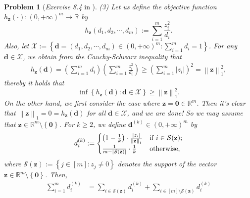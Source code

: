 \documentclass[11pt]{article}
\newtheorem{problem}{Problem}
\numberwithin{equation}{problem}
\begin{document}
\begin{problem} [\emph{Exercise 8.4} in \cite{calafiore2014optimization}]
{\indent (3) Let us define the objective function $h_{\mathbf{z}} (\cdot) : \left( 0, +\infty \right)^m \rightarrow \mathbb{R}$ by
\begin{equation*}
    h_{\mathbf{z}} \left( d_1, d_2, \cdots, d_m \right) :=
    \sum_{i=1}^{m} \frac{z_{i}^2}{d_i}.
\end{equation*}
Also, let $\mathcal{X} := \left\{ \mathbf{d} = \left( d_1, d_2, \cdots, d_m \right) \in \left( 0, +\infty \right)^m : \sum_{i=1}^{m} d_i = 1 \right\}$. For any $\mathbf{d} \in \mathcal{X}$, we obtain from the Cauchy-Schwarz inequality that
\begin{equation*}
    \begin{split}
        h_{\mathbf{z}}(\mathbf{d}) = \left( \sum_{i=1}^{m} d_i \right) \left( \sum_{i=1}^{m} \frac{z_{i}^2}{d_i} \right)
        \geq \left( \sum_{i=1}^{m} \left| z_i \right| \right)^2
        = \left\| \mathbf{z} \right\|_{1}^2,
    \end{split}
\end{equation*}
thereby it holds that
\begin{equation}
    \label{eqn1.9}
    \inf \left\{ h_{\mathbf{z}}(\mathbf{d}) : \mathbf{d} \in \mathcal{X} \right\} \geq \left\| \mathbf{z} \right\|_{1}^2.
\end{equation}
\indent On the other hand, we first consider the case where $\mathbf{z} = \mathbf{0} \in \mathbb{R}^m$. Then it's clear that $\left\| \mathbf{z} \right\|_1 = 0 = h_{\mathbf{z}} (\mathbf{d})$ for all $\mathbf{d} \in \mathcal{X}$, and we are done! So we may assume that $\mathbf{z} \in \mathbb{R}^m \setminus \left\{ \mathbf{0} \right\}$. For $k \geq 2$, we define $\mathbf{d}^{(k)} \in \left( 0, +\infty \right)^m$ by
\begin{equation*}
    d_{i}^{(k)} :=
    \begin{cases}
        \left( 1 - \frac{1}{k} \right) \cdot \frac{\left| z_i \right|}{\left\| \mathbf{z} \right\|_1} & \textnormal{if } i \in \mathcal{S}(\mathbf{z}); \\
        \frac{1}{m - \left| \mathcal{S}(\mathbf{z}) \right|} \cdot \frac{1}{k} & \textnormal{otherwise,}
    \end{cases}
\end{equation*}
where $\mathcal{S}(\mathbf{z}) := \left\{ j \in [m]: z_j \neq 0 \right\}$ denotes the support of the vector $\mathbf{z} \in \mathbb{R}^m \setminus \left\{ \mathbf{0} \right\}$. Then,
\begin{equation*}
    \begin{split}
        \sum_{i=1}^{m} d_{i}^{(k)} &= \sum_{i \in \mathcal{S}(\mathbf{z})} d_{i}^{(k)} + \sum_{i \in [m] \setminus \mathcal{S}(\mathbf{z})} d_{i}^{(k)} \\

\end{split}
\end{equation*}}
\end{problem}
\end{document}
